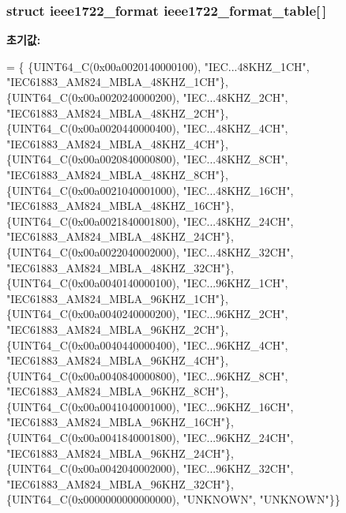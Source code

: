 \subsubsection[{\texorpdfstring{ieee1722\+\_\+format\+\_\+table}{ieee1722_format_table}}]{\setlength{\rightskip}{0pt plus 5cm}struct {\bf ieee1722\+\_\+format} ieee1722\+\_\+format\+\_\+table\mbox{[}$\,$\mbox{]}}\hypertarget{namespaceavdecc__lib_1_1utility_afacbef2365ebe76b1db6fef5f126e3f1}{}\label{namespaceavdecc__lib_1_1utility_afacbef2365ebe76b1db6fef5f126e3f1}
{\bfseries 초기값\+:}
\begin{DoxyCode}
=
        \{
            \{UINT64\_C(0x00a0020140000100), \textcolor{stringliteral}{"IEC...48KHZ\_1CH"}, \textcolor{stringliteral}{"IEC61883\_AM824\_MBLA\_48KHZ\_1CH"}\},
            \{UINT64\_C(0x00a0020240000200), \textcolor{stringliteral}{"IEC...48KHZ\_2CH"}, \textcolor{stringliteral}{"IEC61883\_AM824\_MBLA\_48KHZ\_2CH"}\},
            \{UINT64\_C(0x00a0020440000400), \textcolor{stringliteral}{"IEC...48KHZ\_4CH"}, \textcolor{stringliteral}{"IEC61883\_AM824\_MBLA\_48KHZ\_4CH"}\},
            \{UINT64\_C(0x00a0020840000800), \textcolor{stringliteral}{"IEC...48KHZ\_8CH"}, \textcolor{stringliteral}{"IEC61883\_AM824\_MBLA\_48KHZ\_8CH"}\},
            \{UINT64\_C(0x00a0021040001000), \textcolor{stringliteral}{"IEC...48KHZ\_16CH"}, \textcolor{stringliteral}{"IEC61883\_AM824\_MBLA\_48KHZ\_16CH"}\},
            \{UINT64\_C(0x00a0021840001800), \textcolor{stringliteral}{"IEC...48KHZ\_24CH"}, \textcolor{stringliteral}{"IEC61883\_AM824\_MBLA\_48KHZ\_24CH"}\},
            \{UINT64\_C(0x00a0022040002000), \textcolor{stringliteral}{"IEC...48KHZ\_32CH"}, \textcolor{stringliteral}{"IEC61883\_AM824\_MBLA\_48KHZ\_32CH"}\},
            \{UINT64\_C(0x00a0040140000100), \textcolor{stringliteral}{"IEC...96KHZ\_1CH"}, \textcolor{stringliteral}{"IEC61883\_AM824\_MBLA\_96KHZ\_1CH"}\},
            \{UINT64\_C(0x00a0040240000200), \textcolor{stringliteral}{"IEC...96KHZ\_2CH"}, \textcolor{stringliteral}{"IEC61883\_AM824\_MBLA\_96KHZ\_2CH"}\},
            \{UINT64\_C(0x00a0040440000400), \textcolor{stringliteral}{"IEC...96KHZ\_4CH"}, \textcolor{stringliteral}{"IEC61883\_AM824\_MBLA\_96KHZ\_4CH"}\},
            \{UINT64\_C(0x00a0040840000800), \textcolor{stringliteral}{"IEC...96KHZ\_8CH"}, \textcolor{stringliteral}{"IEC61883\_AM824\_MBLA\_96KHZ\_8CH"}\},
            \{UINT64\_C(0x00a0041040001000), \textcolor{stringliteral}{"IEC...96KHZ\_16CH"}, \textcolor{stringliteral}{"IEC61883\_AM824\_MBLA\_96KHZ\_16CH"}\},
            \{UINT64\_C(0x00a0041840001800), \textcolor{stringliteral}{"IEC...96KHZ\_24CH"}, \textcolor{stringliteral}{"IEC61883\_AM824\_MBLA\_96KHZ\_24CH"}\},
            \{UINT64\_C(0x00a0042040002000), \textcolor{stringliteral}{"IEC...96KHZ\_32CH"}, \textcolor{stringliteral}{"IEC61883\_AM824\_MBLA\_96KHZ\_32CH"}\},
            \{UINT64\_C(0x0000000000000000), \textcolor{stringliteral}{"UNKNOWN"}, \textcolor{stringliteral}{"UNKNOWN"}\}\}
\end{DoxyCode}


